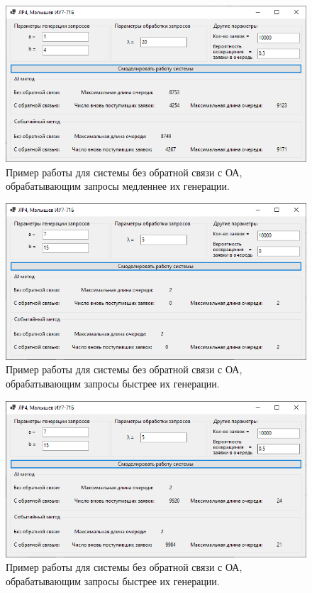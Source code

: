 \documentclass[14pt]{extreport}
\begin{document}
\begin{figure}[H]
	\begin{center}
		\includegraphics[scale=0.8]{imgs/res2.png}
	\end{center}
	\caption{Пример работы для системы без обратной связи с ОА, обрабатывающим запросы медленнее их генерации.}
	\label{img:res2}
\end{figure}

\begin{figure}[H]
	\begin{center}
		\includegraphics[scale=0.8]{imgs/res3.png}
	\end{center}
	\caption{Пример работы для системы без обратной связи с ОА, обрабатывающим запросы быстрее их генерации.}
	\label{img:res3}
\end{figure}

\begin{figure}[H]
	\begin{center}
		\includegraphics[scale=0.8]{imgs/res4.png}
	\end{center}
	\caption{Пример работы для системы без обратной связи с ОА, обрабатывающим запросы быстрее их генерации.}
	\label{img:res4}
\end{figure}
\end{document}
